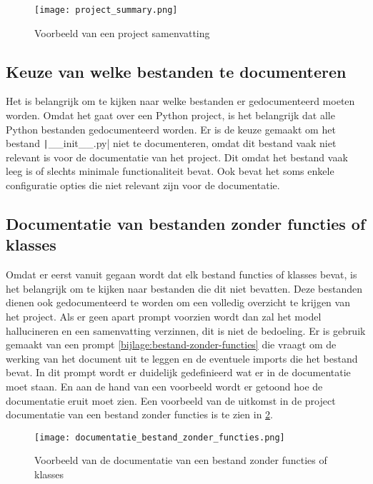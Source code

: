 \begin{figure}[h]
    \centering
    \texttt{[image: project\_summary.png]}
    \caption{Voorbeeld van een project samenvatting}
    \label{fig:project-summary}
\end{figure}    

\subsection{Keuze van welke bestanden te documenteren}
\label{subsec:project-documentatie-keuze-bestanden}

Het is belangrijk om te kijken naar welke bestanden er gedocumenteerd moeten worden.
Omdat het gaat over een Python project, is het belangrijk dat alle Python bestanden gedocumenteerd worden.
Er is de keuze gemaakt om het bestand \texttt|__init__.py| niet te documenteren, omdat dit bestand vaak niet relevant is voor de documentatie van het project.
Dit omdat het bestand vaak leeg is of slechts minimale functionaliteit bevat. 
Ook bevat het soms enkele configuratie opties die niet relevant zijn voor de documentatie.

\subsection{Documentatie van bestanden zonder functies of klasses}
\label{subsec:project-documentatie-geen-functies}

Omdat er eerst vanuit gegaan wordt dat elk bestand functies of klasses bevat, is het belangrijk om te kijken naar bestanden die dit niet bevatten.
Deze bestanden dienen ook gedocumenteerd te worden om een volledig overzicht te krijgen van het project.
Als er geen apart prompt voorzien wordt dan zal het model hallucineren en een samenvatting verzinnen, dit is niet de bedoeling.
Er is gebruik gemaakt van een prompt \ref{bijlage:bestand-zonder-functies} die vraagt om de werking van het document uit te leggen en de eventuele imports die het bestand bevat.
In dit prompt wordt er duidelijk gedefinieerd wat er in de documentatie moet staan. 
En aan de hand van een voorbeeld wordt er getoond hoe de documentatie eruit moet zien.
Een voorbeeld van de uitkomst in de project documentatie van een bestand zonder functies is te zien in \ref{fig:file-no-functions}.

\begin{figure}[h]
    \centering
    \texttt{[image: documentatie\_bestand\_zonder\_functies.png]}
    \caption{Voorbeeld van de documentatie van een bestand zonder functies of klasses}
    \label{fig:file-no-functions}
\end{figure}

